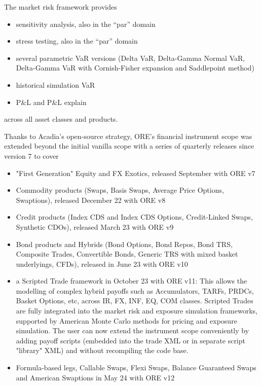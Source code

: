 \medskip
The market risk framework provides
\begin{itemize}
\item sensitivity analysis, also in the ``par'' domain
\item stress testing, also in the ``par'' domain
\item several parametric VaR versions (Delta VaR, Delta-Gamma Normal VaR, Delta-Gamma VaR with Cornish-Fisher expansion and Saddlepoint method)
\item historical simulation VaR
\item P\&L and P\&L explain
\end{itemize}
across all asset classes and products. 

\medskip
Thanks to Acadia's open-source strategy, ORE's financial instrument scope was extended beyond the initial vanilla scope with
a series of quarterly releases since version 7 to cover
\begin{itemize}
\item "First Generation" Equity and FX Exotics, released September with ORE v7
\item Commodity products (Swaps, Basis Swaps, Average Price Options, Swaptions), released December 22 with ORE v8
\item Credit products (Index CDS and Index CDS Options, Credit-Linked Swaps, Synthetic CDOs), released March 23 with ORE v9
\item Bond products and Hybrids (Bond Options, Bond Repos, Bond TRS, Composite Trades, Convertible Bonds, Generic TRS with mixed basket underlyings, CFDs), released in June 23 with ORE v10
\item a Scripted Trade framework in October 23 with ORE v11: This allows the modelling of complex hybrid payoffs
  such as Accumulators, TARFs, PRDCs, Basket Options, etc, across IR, FX, INF, EQ, COM classes.  Scripted Trades are fully
  integrated into the market risk and exposure simulation frameworks, supported by American Monte Carlo methods for pricing
  and exposure simulation. The user can now extend the instrument scope conveniently by adding payoff scripts (embedded into
  the trade XML or in separate script "library" XML) and without recompiling the code base.
\item Formula-based legs, Callable Swaps, Flexi Swaps, Balance Guaranteed Swaps and American Swaptions in May 24 with ORE v12
\end{itemize}

